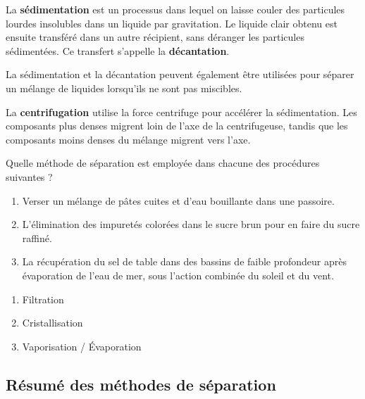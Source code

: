 \documentclass[
  11pt,
  a4paper,
  openany]{book}
\providecommand{\tightlist}{%
  \setlength{\itemsep}{0pt}\setlength{\parskip}{0pt}}
\begin{document}
La \textbf{sédimentation} est un processus dans lequel on laisse couler des particules lourdes insolubles dans un liquide par gravitation. Le liquide clair obtenu est ensuite transféré dans un autre récipient, sans déranger les particules sédimentées. Ce transfert s'appelle la \textbf{décantation}.

La sédimentation et la décantation peuvent également être utilisées pour séparer un mélange de liquides lorsqu'ils ne sont pas miscibles.

La \textbf{centrifugation} utilise la force centrifuge pour accélérer la sédimentation. Les composants plus denses migrent loin de l'axe de la centrifugeuse, tandis que les composants moins denses du mélange migrent vers l'axe.

\newpage

\begin{Exercise}

Quelle méthode de séparation est employée dans chacune des procédures suivantes ?

\begin{enumerate}
\def\labelenumi{\arabic{enumi}.}
\tightlist
\item
  Verser un mélange de pâtes cuites et d'eau bouillante dans une passoire.
\item
  L'élimination des impuretés colorées dans le sucre brun pour en faire du sucre raffiné.
\item
  La récupération du sel de table dans des bassins de faible profondeur après évaporation de l'eau de mer, sous l'action combinée du soleil et du vent.
\end{enumerate}

\end{Exercise}

\begin{Answer}

\begin{enumerate}
\def\labelenumi{\arabic{enumi}.}
\tightlist
\item
  Filtration
\item
  Cristallisation
\item
  Vaporisation / Évaporation
\end{enumerate}

\end{Answer}

\subsection{Résumé des méthodes de séparation}\label{ruxe9sumuxe9-des-muxe9thodes-de-suxe9paration}
\end{document}
